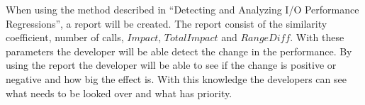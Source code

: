 \newline
When using the method described in ``Detecting and Analyzing I/O Performance Regressions'', a report will be created. The report consist of the similarity coefficient, number of calls, $Impact$, $TotalImpact$ and $RangeDiff$. With these parameters the developer will be able detect the change in the performance. By using the report the developer will be able to see if the change is positive or negative and how big the effect is. With this knowledge the developers can see what needs to be looked over and what has priority.
